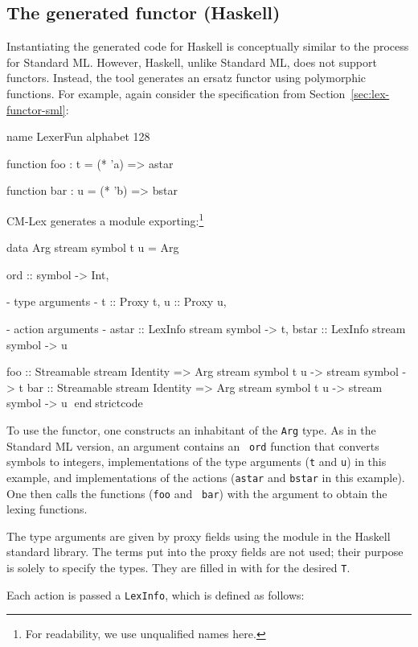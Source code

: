\documentclass[10pt]{article}
\begin{document}
\begin{strictcode}
\subsection{The generated functor (Haskell)}
\label{sec:lex-functor-hs}

Instantiating the generated code for Haskell is conceptually similar
to the process for Standard ML.  However, Haskell, unlike Standard ML,
does not support functors.  Instead, the tool generates an ersatz
functor using polymorphic functions.  For example, again consider the
specification from Section~\ref{sec:lex-functor-sml}:

\begin{code}
name LexerFun
alphabet 128

function foo : t =
  (* 'a) => astar

function bar : u =
  (* 'b) => bstar
\end{code}


CM-Lex generates a module exporting:\footnote{For readability, we
use unqualified names here.}


\begin{strictcode}
data Arg stream symbol t u =
   Arg { ord :: symbol -> Int,

         {- type arguments -}
         t :: Proxy t,
         u :: Proxy u,

         {- action arguments -}
         astar :: LexInfo stream symbol -> t,
         bstar :: LexInfo stream symbol -> u }

foo :: Streamable stream Identity
       => Arg stream symbol t u -> stream symbol -> t
bar :: Streamable stream Identity
       => Arg stream symbol t u -> stream symbol -> u
endstrictcode


To use the functor, one constructs an inhabitant of the {\tt Arg}
type.  As in the Standard ML version, an argument contains an {\tt
ord} function that converts symbols to integers, implementations of
the type arguments ({\tt t} and {\tt u}) in this example, and
implementations of the actions ({\tt astar} and {\tt bstar} in this
example).  One then calls the functions ({\tt foo} and {\tt
bar}) with the argument to obtain the lexing functions.

The type arguments are given by proxy fields using the
 module in the Haskell standard library.  The terms put into the
proxy fields are not used; their purpose is solely to specify the
types.  They are filled in with  for
the desired {\tt T}.

Each action is passed a {\tt LexInfo}, which is defined as follows:


\end{strictcode}
\end{strictcode}
\end{document}
